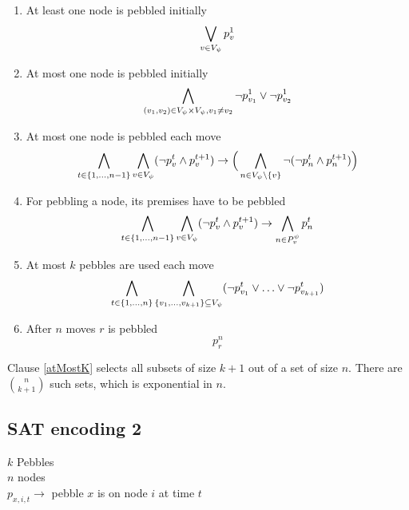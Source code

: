 \documentclass{llncs}
\begin{document}
\begin{enumerate}
	\item At least one node is pebbled initially\\
				$$\bigvee_{v \in V_{\psi}} p_{v}^{1}$$
				
	\item At most one node is pebbled initially\\
				$$\bigwedge_{(v_1, v_2) \in V_{\psi} \times V_{\psi}, v_1 \neq v_2} \neg p_{v_1}^{1} \vee \neg p_{v_2}^{1}$$
				
	\item At most one node is pebbled each move\\
				$$\bigwedge_{t \in \{1,\ldots,n-1\}} \bigwedge_{v \in V_{\psi}} (\neg p_{v}^t \wedge p_{v}^{t+1}) \rightarrow 
				\Big(\bigwedge_{n \in V_{\psi} \setminus \{v\}} \neg (\neg p_{n}^t \wedge p_{n}^{t+1})\Big)$$
				
	\item For pebbling a node, its premises have to be pebbled\\
				$$\bigwedge_{t \in \{1,\ldots,n-1\}} \bigwedge_{v \in V_{\psi}} (\neg p_{v}^t \wedge p_{v}^{t+1}) \rightarrow
				\bigwedge_{n \in P_{v}^{\psi}} p_{n}^t$$
				
	\item \label{atMostK} At most $k$ pebbles are used each move\\
				$$\bigwedge_{t \in \{1,\ldots,n\}} \bigwedge_{\{v_1,\ldots,v_{k+1}\} \subseteq V_{\psi}} (\neg p_{v_1}^t \vee \ldots \vee \neg p_{v_{k+1}}^t)$$
				
	\item After $n$ moves $r$ is pebbled \\
				$$p_{r}^{n}$$
\end{enumerate}

Clause \ref{atMostK} selects all subsets of size $k+1$ out of a set of size $n$. There are $n \choose k+1$ such sets, which is exponential in $n$.

\subsection{SAT encoding 2}

$k$ Pebbles\\
$n$ nodes\\
$p_{x,i,t} \rightarrow $ pebble $x$ is on node $i$ at time $t$
\end{document}
